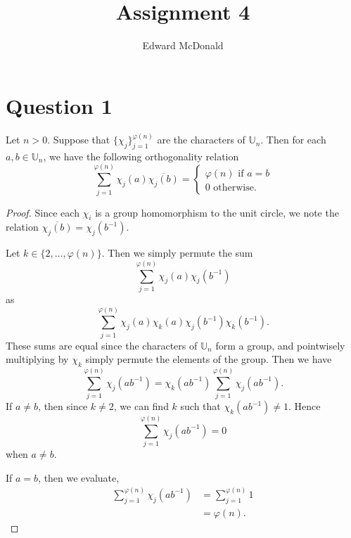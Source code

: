 \documentclass{unswmaths}
\begin{document}
\subject{Number Theory}
\author{Edward McDonald}
\title{Assignment 4}


\setlength\parindent{0pt}

\newcommand{\Unit}{\mathbb{U}}
\newcommand{\modulo}[1]{\;\operatorname{mod}\;#1}

\unswtitle{}

\section*{Question 1}
    \begin{lemma}
        \label{charOrth}
        Let $n > 0$. Suppose that $\{\chi_j\}_{j=1}^{\varphi(n)}$ are the characters
        of $\Unit_n$. Then for each $a,b\in \Unit_n$, we have the following orthogonality
        relation
        \begin{equation*}
            \sum_{j=1}^{\varphi(n)} \chi_j(a)\overline{\chi_j(b)} = \begin{cases}
                \varphi(n)\text{ if }a = b\\
                0\text{ otherwise.}
            \end{cases}
        \end{equation*}
    \end{lemma}
    \begin{proof}
        Since each $\chi_i$ is a group homomorphism to the unit circle,
        we note the relation $\overline{\chi_j(b)} = \chi_j(b^{-1})$. 
        
        Let $k \in \{2,\ldots,\varphi(n)\}$. Then we simply permute
        the sum
        \begin{equation*}
            \sum_{j=1}^{\varphi(n)} \chi_j(a)\chi_j(b^{-1})
        \end{equation*}
        as
        \begin{equation*}
            \sum_{j=1}^{\varphi(n)} \chi_j(a)\chi_k(a)\chi_j(b^{-1})\chi_{k}(b^{-1}).
        \end{equation*}
        These sums are equal since the characters of $\Unit_n$ form a group, and pointwisely
        multiplying by $\chi_k$ simply permute the elements of the group. Then we have
        \begin{equation*}
            \sum_{j=1}^{\varphi(n)} \chi_j(ab^{-1}) = \chi_k(ab^{-1})\sum_{j=1}^{\varphi(n)} \chi_j(ab^{-1}).
        \end{equation*}
        If $a \neq b$, then since $k \neq 2$, we can find $k$ such that $\chi_k(ab^{-1}) \neq 1$. Hence
        \begin{equation*}
            \sum_{j=1}^{\varphi(n)} \chi_j(ab^{-1}) = 0
        \end{equation*}
        when $a\neq b$.
        
        If $a = b$, then we evaluate,
        \begin{align*}
            \sum_{j=1}^{\varphi(n)} \chi_j(ab^{-1}) &= \sum_{j=1}^{\varphi(n)} 1\\
            &= \varphi(n).
        \end{align*}
    \end{proof}
\end{document}
